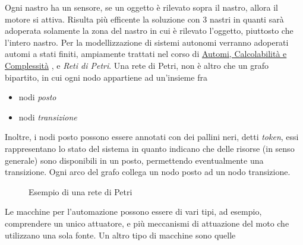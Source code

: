 \documentclass[10pt, letterpaper]{report}
\begin{document}
Ogni nastro ha un sensore, se un oggetto è rilevato sopra il nastro, allora il motore si attiva. Risulta più efficente 
la soluzione con 3 nastri in quanti sarà adoperata solamente la zona del nastro in cui è rilevato l'oggetto, piuttosto 
che l'intero nastro.\acc 
Per la modellizzazione di sistemi autonomi verranno adoperati automi a stati finiti, ampiamente trattati nel 
corso di 
\color{blue}\href{https://github.com/CasuFrost/University_notes/blob/main/Terzo%20Anno/Automi%2C%20Calcolabilit%C3%A0%20e%20Complessit%C3%A0/Automi%2C%20Calcolabilit%C3%A0%20e%20Complessit%C3%A0.pdf}{Automi, Calcolabilità e Complessità}
\color{black}, e \textit{Reti di Petri}. Una rete di Petri, non è altro che un grafo bipartito, in cui ogni nodo 
appartiene ad un'insieme fra \begin{itemize}
    \item nodi \textit{posto}
    \item nodi \textit{transizione}
\end{itemize}
Inoltre, i nodi posto possono essere annotati con dei pallini neri, detti \textit{token}, essi rappresentano 
lo stato del sistema in quanto indicano che delle risorse (in senso generale) sono disponibili in un posto, 
permettendo eventualmente una transizione. Ogni arco del grafo collega un nodo posto ad un nodo transizione.
\begin{figure}[h!]
    \centering
      \caption{Esempio di una rete di Petri}
\end{figure}\acc
Le macchine per l'automazione possono essere di vari tipi, ad esempio, comprendere un unico attuatore, e più 
meccanismi di attuazione del moto che utilizzano una sola fonte. Un altro tipo di macchine sono quelle 
\end{document}

